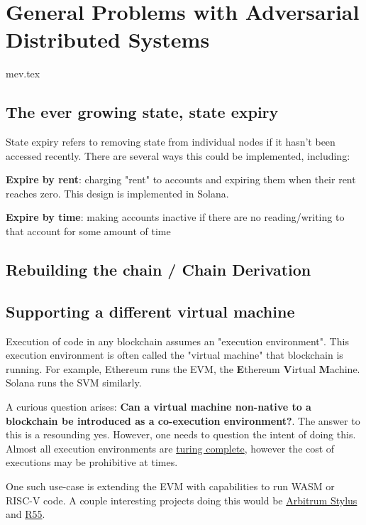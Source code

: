 \chapter{General Problems with Adversarial Distributed Systems}

{mev.tex}

\section{The ever growing state, state expiry}
State expiry refers to removing state from individual nodes if it hasn't been accessed recently. There are several ways this could be implemented, including:

\textbf{Expire by rent}: charging "rent" to accounts and expiring them when their rent reaches zero. This design is implemented in Solana.

\textbf{Expire by time}: making accounts inactive if there are no reading/writing to that account for some amount of time


\section{Rebuilding the chain / Chain Derivation}

\section{Supporting a different virtual machine}
Execution of code in any blockchain assumes an "execution environment". This execution environment is often called the "virtual machine" that blockchain is running. For example, Ethereum runs the EVM, the \textbf{E}thereum \textbf{V}irtual \textbf{M}achine. Solana runs the SVM similarly.

A curious question arises: \textbf{Can a virtual machine non-native to a blockchain be introduced as a co-execution environment?}. The answer to this is a resounding yes. However, one needs to question the intent of doing this. Almost all execution environments are \href{https://www.bitstamp.net/learn/blockchain/what-is-turing-complete/}{turing complete}, however the cost of executions may be prohibitive at times.

One such use-case is extending the EVM with capabilities to run WASM or RISC-V code. A couple interesting projects doing this would be \href{https://arbitrum.io/stylus}{Arbitrum Stylus} and \href{https://hackmd.io/@leoalt/r55}{R55}.

